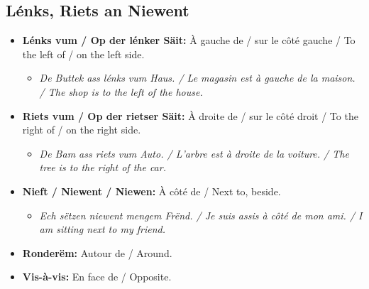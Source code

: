 \subsection*{Lénks, Riets an Niewent}
\begin{itemize}
    \item \textbf{Lénks vum / Op der lénker Säit:} À gauche de / sur le côté gauche / To the left of / on the left side.
        \begin{itemize}
            \item \textit{De Buttek ass lénks vum Haus. / Le magasin est à gauche de la maison. / The shop is to the left of the house.}
        \end{itemize}
    \item \textbf{Riets vum / Op der rietser Säit:} À droite de / sur le côté droit / To the right of / on the right side.
        \begin{itemize}
            \item \textit{De Bam ass riets vum Auto. / L'arbre est à droite de la voiture. / The tree is to the right of the car.}
        \end{itemize}
    \item \textbf{Nieft / Niewent / Niewen:} À côté de / Next to, beside.
        \begin{itemize}
            \item \textit{Ech sëtzen niewent mengem Frënd. / Je suis assis à côté de mon ami. / I am sitting next to my friend.}
        \end{itemize}
    \item \textbf{Ronderëm:} Autour de / Around.
    \item \textbf{Vis-à-vis:} En face de / Opposite.
\end{itemize}

